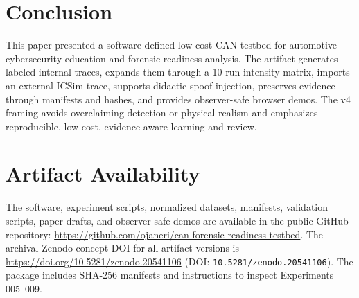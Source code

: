 \documentclass[conference]{IEEEtran}
\begin{document}
\section{Conclusion}
This paper presented a software-defined low-cost CAN testbed for automotive cybersecurity education and forensic-readiness analysis. The artifact generates labeled internal traces, expands them through a 10-run intensity matrix, imports an external ICSim trace, supports didactic spoof injection, preserves evidence through manifests and hashes, and provides observer-safe browser demos. The v4 framing avoids overclaiming detection or physical realism and emphasizes reproducible, low-cost, evidence-aware learning and review.

\section*{Artifact Availability}
The software, experiment scripts, normalized datasets, manifests, validation scripts, paper drafts, and observer-safe demos are available in the public GitHub repository: \url{https://github.com/ojaneri/can-forensic-readiness-testbed}. The archival Zenodo concept DOI for all artifact versions is \url{https://doi.org/10.5281/zenodo.20541106} (DOI: \texttt{10.5281/zenodo.20541106}). The package includes SHA-256 manifests and instructions to inspect Experiments 005--009.



\end{document}
